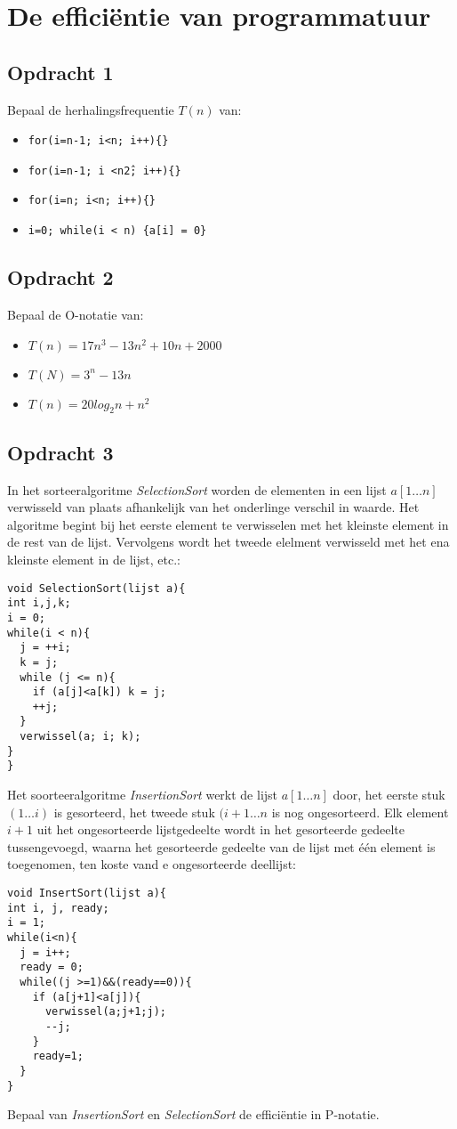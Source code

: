 \chapter{De effici\"{e}ntie van programmatuur}
\section{Opdracht 1}
Bepaal de herhalingsfrequentie $T(n)$ van:
  \begin{itemize}
    \item \texttt{for(i=n-1; i<n; i++)\{\}}
    \item \texttt{for(i=n-1; i <n\^2; i++)\{\}}
    \item \texttt{for(i=n; i<n; i++)\{\}}
    \item \texttt{i=0; while(i < n) \{a[i] = 0\}}
  \end{itemize}

\section{Opdracht 2}
Bepaal de O-notatie van:
\begin{itemize}
  \item $T(n)=17n^3-13n^2+10n+2000$
  \item $T(N)=3^n-13n$
  \item $T(n)=20log_2n+n^2$
\end{itemize}

\section{Opdracht 3}
In het sorteeralgoritme \emph{SelectionSort} worden de elementen in een lijst $a[1\ldots{}n]$ verwisseld van plaats afhankelijk van het onderlinge verschil in waarde. Het algoritme begint bij het eerste element te verwisselen met het kleinste element in de rest van de lijst. Vervolgens wordt het tweede elelment verwisseld met het ena kleinste element in de lijst, etc.:
\begin{lstlisting}
void SelectionSort(lijst a){
int i,j,k;
i = 0;
while(i < n){
  j = ++i;
  k = j;
  while (j <= n){
    if (a[j]<a[k]) k = j;
    ++j;
  }
  verwissel(a; i; k);
}
}
\end{lstlisting}
Het soorteeralgoritme \emph{InsertionSort} werkt de lijst $a[1\ldots n]$ door, het eerste stuk $(1\ldots i)$ is gesorteerd, het tweede stuk $(i+1\ldots n$ is nog ongesorteerd.
 Elk element $i+1$ uit het ongesorteerde lijstgedeelte wordt in het gesorteerde gedeelte tussengevoegd, waarna het gesorteerde gedeelte van de lijst met \'{e}\'{e}n element is toegenomen, ten koste vand e ongesorteerde deellijst:
\begin{lstlisting}
void InsertSort(lijst a){
int i, j, ready;
i = 1;
while(i<n){
  j = i++;
  ready = 0;
  while((j >=1)&&(ready==0)){
    if (a[j+1]<a[j]){
      verwissel(a;j+1;j);
      --j;
    }
    ready=1;
  }
}
\end{lstlisting}
Bepaal van \emph{InsertionSort} en \emph{SelectionSort} de effici\"{e}ntie in P-notatie.

